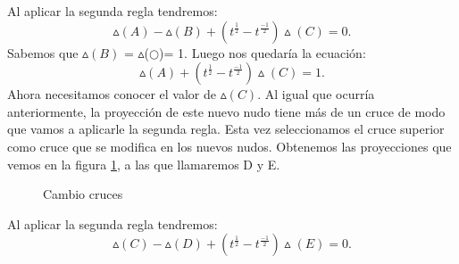 Al aplicar la segunda regla tendremos:\\
\begin{equation}
\vartriangle(A) - \vartriangle(B) +  (t^{\frac{1}{2}} - t^{\frac{-1}{2}}) \vartriangle(C)  = 0.
\end{equation}
Sabemos que $\vartriangle(B)$ = $\vartriangle$($\bigcirc$)= 1. Luego nos quedaría la ecuación:
\begin{equation}
\vartriangle(A) +  (t^{\frac{1}{2}} - t^{\frac{-1}{2}}) \vartriangle(C)  = 1.
\end{equation}
Ahora necesitamos conocer el valor de $\vartriangle(C)$. Al igual que ocurría anteriormente, la proyección de este nuevo nudo tiene más de un cruce de modo que vamos a aplicarle la segunda regla. Esta vez seleccionamos el cruce superior como cruce que se modifica en los nuevos nudos. Obtenemos las proyecciones que vemos en la figura \ref{alex3}, a las que llamaremos D y E. 
\begin{figure}[h!]
	\centering
	\caption{Cambio cruces}
	\label{alex3} 
\end{figure}

Al aplicar la segunda regla tendremos:\\
\begin{equation}
\vartriangle(C) - \vartriangle(D) +  (t^{\frac{1}{2}} - t^{\frac{-1}{2}}) \vartriangle(E)  = 0.
\end{equation}

